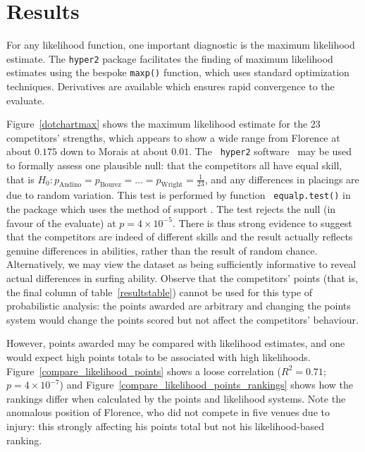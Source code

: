 \documentclass{article}
\begin{document}
\section{Results}

For any likelihood function, one important diagnostic is the maximum
likelihood estimate.  The {\tt hyper2} package facilitates the finding
of maximum likelihood estimates using the bespoke {\tt maxp()}
function, which uses standard optimization techniques.  Derivatives
are available which ensures rapid convergence to the evaluate.

Figure~\ref{dotchartmax} shows the maximum likelihood estimate for the
23 competitors' strengths, which appears to show a wide range from
Florence at about $0.175$ down to Morais at about $0.01$.  The {\tt
  hyper2} software~\citep{hankin2017_nomarkup} may be used to formally assess
one plausible null: that the competitors all have equal skill, that is
$H_0\colon p_\mathrm{Andino} = p_\mathrm{Bourez}=\ldots=
p_\mathrm{Wright}=\frac{1}{23}$, and any differences in placings are
due to random variation.  This test is performed by function {\tt
  equalp.test()} in the package which uses the method of support
\citep{edwards1992}.  The test rejects the null (in favour of the
evaluate) at $p=4\times 10^{-5}$.  There is thus strong evidence to
suggest that the competitors are indeed of different skills and the
result actually reflects genuine differences in abilities, rather than
the result of random chance.  Alternatively, we may view the dataset
as being sufficiently informative to reveal actual differences in
surfing ability.  Observe that the competitors' points (that is, the
final column of table~\ref{resultstable}) cannot be used for this type
of probabilistic analysis: the points awarded are arbitrary and
changing the points system would change the points scored but not
affect the competitors' behaviour.

However, points awarded may be compared with likelihood estimates, and
one would expect high points totals to be associated with high
likelihoods.  Figure~\ref{compare_likelihood_points} shows a loose
correlation ($R^2=0.71$; $p=4\times 10^{-7}$) and
Figure~\ref{compare_likelihood_points_rankings} shows how the rankings
differ when calculated by the points and likelihood systems.  Note the
anomalous position of Florence, who did not compete in five venues due
to injury: this strongly affecting his points total but not his
likelihood-based ranking.
\end{document}
